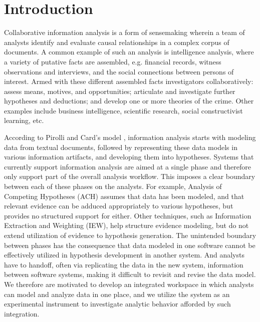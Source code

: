\section{Introduction}\label{introduction}

Collaborative information analysis is a form of sensemaking wherein a team of analysts
identify and evaluate causal relationships in a complex corpus of documents. A
common example of such an analysis is intelligence analysis, where a variety of putative facts are assembled, e.g.
financial records, witness observations and interviews, and the social
connections between persons of interest. Armed with these different assembled facts
 investigators collaboratively: assess means, motives,
and opportunities; articulate and investigate further hypotheses and deductions;
and develop one or more theories of the crime. Other examples include business intelligence, scientific research, social constructivist learning, etc.


According to Pirolli and Card's model \cite{Pirolli2005}, information analysis
starts with modeling data from textual documents, followed by representing these
data models in various information artifacts, and developing them into
hypotheses.  Systems that currently support information analysis are aimed at a
single phase and therefore only support part of the overall analysis workflow.
This imposes a clear boundary between each of these phases on the analysts. For
example, Analysis of Competing Hypotheses (ACH) assumes
that data has been modeled, and that relevant evidence can be adduced
appropriately to various hypotheses, but provides no structured support for
either. Other techniques, such as Information Extraction and Weighting (IEW),
help structure evidence modeling, but do not extend utilization of evidence to
hypothesis generation. The unintended boundary between phases has the
consequence that data modeled in one software cannot be effectively utilized in
hypothesis development in another system. And analysts have to handoff, often
via replicating the data in the new system, information between software
systems, making it difficult to revisit and revise the data model. We therefore
are motivated to develop an integrated workspace in which analysts can model and
analyze data in one place, and we utilize the system as an experimental
instrument to investigate analytic behavior afforded by such integration.

